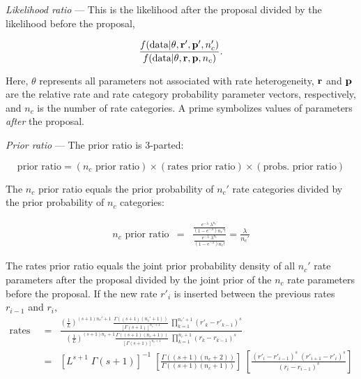 \documentclass[12pt]{article}
\newcommand{\ncat}{n_c}
\begin{document}
{\em Likelihood ratio} --- This is the likelihood after the proposal divided by the likelihood before the proposal,

\[ \frac{f(\mbox{data} | {\bf \theta}, {\bf r}', {\bf p}', \ncat')}{f(\mbox{data} | {\bf \theta}, {\bf r}, {\bf p}, \ncat)}. \]

Here, $\theta$ represents all parameters not associated with rate heterogeneity, $\bf r$ and $\bf p$ are the relative rate and rate category probability parameter vectors, respectively, and $\ncat$ is the number of rate categories. A prime symbolizes values of parameters {\em after} the proposal.

{\em Prior ratio} --- The prior ratio is 3-parted:

\[ \mbox{prior ratio} = (\mbox{$\ncat$ prior ratio}) \times (\mbox{rates prior ratio}) \times (\mbox{probs. prior ratio}) \]

The $\ncat$ prior ratio equals the prior probability of $\ncat'$ rate categories divided by the prior probability of $\ncat$ categories:

\begin{eqnarray*}
\mbox{$\ncat$ prior ratio} & = & \frac{\frac{e^{-\lambda} \; \lambda^{\ncat'}}{\left( 1 - e^{-\lambda} \right) {\ncat'}!}}{\frac{e^{-\lambda} \; \lambda^{\ncat}}{\left( 1 - e^{-\lambda} \right) {\ncat}!}} =  \frac{\lambda}{\ncat'}
\end{eqnarray*}

The rates prior ratio equals the joint prior probability density of all $\ncat'$ rate parameters after the proposal divided by the joint prior of the $\ncat$ rate parameters before the proposal. If the new rate $r'_i$ is inserted between the previous rates $r_{i-1}$ and $r_i$,
\begin{eqnarray*}
\mbox{rates prior ratio} 
  & = & \frac
  {
    \left( \frac{1}{L} \right)^{(s+1) \ncat' + 1} \; 
    \frac{ \Gamma\left( (s+1) (\ncat' + 1) \right) }{ \left[ \Gamma(s+1) \right]^{\ncat' + 1} } \;
    \prod_{k=1}^{\ncat' + 1} ({r'}_k - {r'}_{k-1})^s
  }
  {
    \left( \frac{1}{L} \right)^{(s+1) \ncat + 1}
    \frac{ \Gamma\left( (s+1) (\ncat + 1) \right) }{ \left[ \Gamma(s+1) \right]^{\ncat + 1} } \;
    \prod_{k=1}^{\ncat + 1} (r_k - r_{k-1})^s
  } \\
  & = & \left[ L^{s+1} \; \Gamma(s+1)\right]^{-1} \; 
  \left[ \frac{\Gamma\left( (s+1) (\ncat + 2) \right)}{\Gamma\left( (s+1) (\ncat + 1) \right)} \right] \;
  \left[ \frac{(r'_i - r'_{i-1})^s \; (r'_{i+1} - r'_i)^s}{(r_i - r_{i-1})^s} \right]
\end{eqnarray*}
\end{document}

